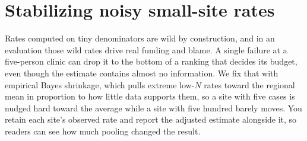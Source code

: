 \section{Stabilizing noisy small-site rates}\label{sec:shrink}
Rates computed on tiny denominators are wild by construction, and in an evaluation those wild rates drive real funding and blame. A single failure at a five-person clinic can drop it to the bottom of a ranking that decides its budget, even though the estimate contains almost no information. We fix that with empirical Bayes shrinkage, which pulls extreme low-$N$ rates toward the regional mean in proportion to how little data supports them, so a site with five cases is nudged hard toward the average while a site with five hundred barely moves. You retain each site's observed rate and report the adjusted estimate alongside it, so readers can see how much pooling changed the result.


